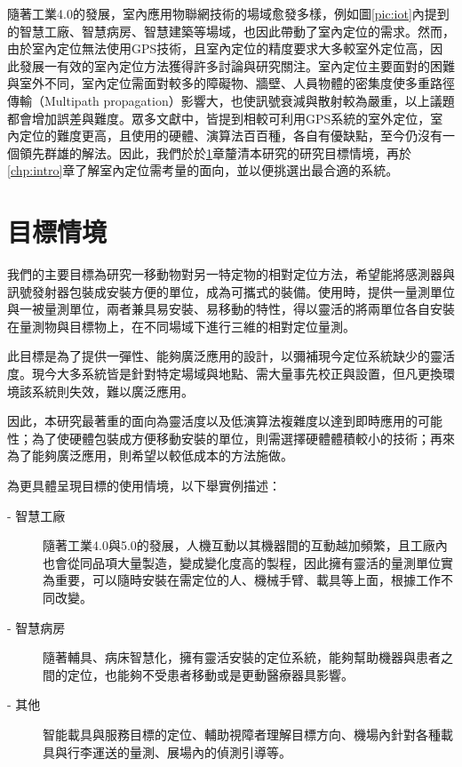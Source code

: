 隨著工業4.0的發展，室內應用物聯網技術的場域愈發多樣，例如圖\ref{pic:iot}內提到的智慧工廠、智慧病房、智慧建築等場域，也因此帶動了室內定位的需求。然而，由於室內定位無法使用GPS技術，且室內定位的精度要求大多較室外定位高，因此發展一有效的室內定位方法獲得許多討論與研究關注\cite{survey_indoor2014}。室內定位主要面對的困難與室外不同，室內定位需面對較多的障礙物、牆壁、人員物體的密集度使多重路徑傳輸（Multipath propagation）影響大，也使訊號衰減與散射較為嚴重，以上議題都會增加誤差與難度。眾多文獻中，\cite{survey_light2018}\cite{survey_indoor2014}\cite{survey_indoor2018}\cite{survey_light2020}\cite{survey:indoor_wayfinding}皆提到相較可利用GPS系統的室外定位，室內定位的難度更高，且使用的硬體、演算法百百種，各自有優缺點，至今仍沒有一個領先群雄的解法。因此，我們於於\ref{chp:motivate}章釐清本研究的研究目標情境，再於\ref{chp:intro}章了解室內定位需考量的面向，並以便挑選出最合適的系統。






\section{目標情境}
\label{chp:motivate}
我們的主要目標為研究一移動物對另一特定物的相對定位方法，希望能將感測器與訊號發射器包裝成安裝方便的單位，成為可攜式的裝備。使用時，提供一量測單位與一被量測單位，兩者兼具易安裝、易移動的特性，得以靈活的將兩單位各自安裝在量測物與目標物上，在不同場域下進行三維的相對定位量測。

此目標是為了提供一彈性、能夠廣泛應用的設計，以彌補現今定位系統缺少的靈活度。現今大多系統皆是針對特定場域與地點、需大量事先校正與設置，但凡更換環境該系統則失效，難以廣泛應用。

因此，本研究最著重的面向為靈活度以及低演算法複雜度以達到即時應用的可能性；為了使硬體包裝成方便移動安裝的單位，則需選擇硬體體積較小的技術；再來為了能夠廣泛應用，則希望以較低成本的方法施做。

為更具體呈現目標的使用情境，以下舉實例描述：
\begin{description}
    \item[- 智慧工廠] \hfill 
    
    \quad \quad 
    隨著工業4.0與5.0的發展，人機互動以其機器間的互動越加頻繁，且工廠內也會從同品項大量製造，變成變化度高的製程，因此擁有靈活的量測單位實為重要，可以隨時安裝在需定位的人、機械手臂、載具等上面，根據工作不同改變。

    \item[- 智慧病房] \hfill 
    
    \qquad
    隨著輔具、病床智慧化，擁有靈活安裝的定位系統，能夠幫助機器與患者之間的定位，也能夠不受患者移動或是更動醫療器具影響。
    
    \item[- 其他]  \hfill 
    
    \qquad
    智能載具與服務目標的定位、輔助視障者理解目標方向、機場內針對各種載具與行李運送的量測、展場內的偵測引導等。
\end{description}

